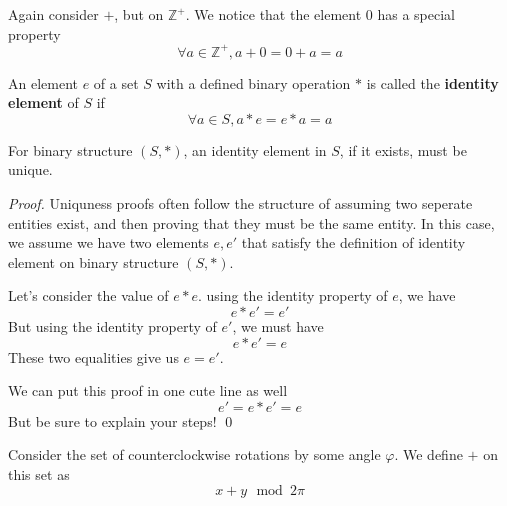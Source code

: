 \documentclass{report}
\begin{document}
\begin{example}
    Again consider $+$, but on $\mathbb{Z}^+$. We notice that the element $0$ has a special property
    \begin{equation*}
        \forall a \in \mathbb{Z}^+, a + 0 = 0 + a = a
    \end{equation*}
\end{example}

\begin{definition}
    An element $e$ of a set $S$ with a defined binary operation $*$ is called the \textbf{identity element} of $S$ if
    \begin{equation*}
        \forall a \in S, a * e = e * a = a
    \end{equation*}
\end{definition}

\begin{lemma}
    For binary structure $(S, *)$, an identity element in $S$, if it exists, must be unique.
\end{lemma}

\begin{proof}
    Uniquness proofs often follow the structure of assuming two seperate entities exist, and then proving that they must be the same entity. In this case, we assume we have two elements $e, e'$ that satisfy the definition of identity element on binary structure $(S, *)$. 

    Let's consider the value of $e * e$. using the identity property of $e$, we have \begin{equation*}
        e * e' = e'
    \end{equation*}
    But using the identity property of $e'$, we must have
    \begin{equation*}
        e * e' = e
    \end{equation*}
    These two equalities give us $e = e'$.

    We can put this proof in one cute line as well
    \begin{equation*}
        e' = e * e' = e
    \end{equation*}
    But be sure to explain your steps!
    \qed
\end{proof}

\begin{example}
    Consider the set of counterclockwise rotations by some angle $\varphi$.
    We define $+$ on this set as
    \begin{equation*}
        x + y \, \bmod 2 \pi
    \end{equation*}
\end{example}
\end{document}
